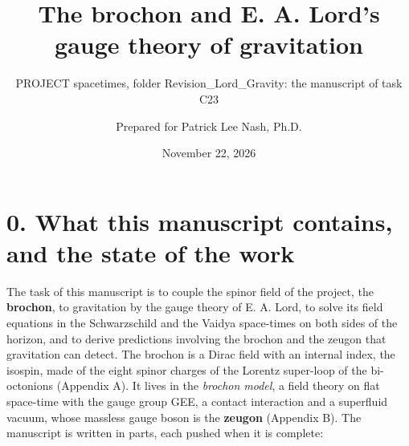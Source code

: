 \documentclass[
  10pt,
]{article}
\title{The brochon and E. A. Lord's gauge theory of gravitation}
\subtitle{PROJECT spacetimes, folder Revision\_Lord\_Gravity: the
manuscript of task C23}
\author{Prepared for Patrick Lee Nash, Ph.D.}
\date{November 22, 2026}
\begin{document}
\maketitle

\hypertarget{what-this-manuscript-contains-and-the-state-of-the-work}{%
\section{0. What this manuscript contains, and the state of the
work}\label{what-this-manuscript-contains-and-the-state-of-the-work}}

The task of this manuscript is to couple the spinor field of the
project, the \textbf{brochon}, to gravitation by the gauge theory of E.
A. Lord, to solve its field equations in the Schwarzschild and the
Vaidya space-times on both sides of the horizon, and to derive
predictions involving the brochon and the zeugon that gravitation can
detect. The brochon is a Dirac field with an internal index, the
isospin, made of the eight spinor charges of the Lorentz super-loop of
the bi-octonions (Appendix A). It lives in the \emph{brochon model}, a
field theory on flat space-time with the gauge group GEE, a contact
interaction and a superfluid vacuum, whose massless gauge boson is the
\textbf{zeugon} (Appendix B). The manuscript is written in parts, each
pushed when it is complete:
\end{document}

